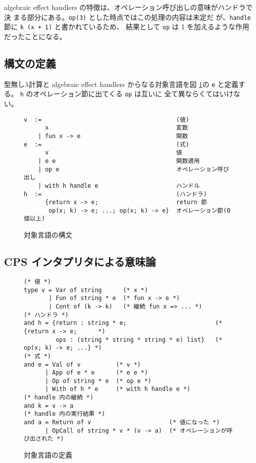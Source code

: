 algebraic effect handlers の特徴は、オペレーション呼び出しの意味がハンドラで決
まる部分にある。\texttt{op(3)} とした時点ではこの処理の内容は未定だ
が、\texttt{handle} 節に \texttt{k (x + 1)} と書かれているため、
結果として \texttt{op} は 1 を加えるような作用だったことになる。

\subsection{構文の定義}
\label{subsection:syntax}
型無し$\lambda$計算と algebraic effect handlers からなる対象言語を図 \ref{figure:abstract_syntax}の \texttt{e} と定義する。
\texttt{h} のオペレーション節に出てくる \texttt{op} は互いに
全て異ならくてはいけない。

\begin{figure}[t]
\begin{verbatim}
v  :=                                      (値)
      x                                    変数
    | fun x -> e                           関数
e  :=                                      (式)
      v                                    値
    | e e                                  関数適用
    | op e                                 オペレーション呼び出し
    | with h handle e                      ハンドル
h  :=                                      (ハンドラ)
      {return x -> e;                      return 節
       op(x; k) -> e; ...; op(x; k) -> e}  オペレーション節(0個以上)
\end{verbatim}
\caption{対象言語の構文}
\label{figure:abstract_syntax}
\end{figure}

\subsection{CPS インタプリタによる意味論}
\label{subsection:1cps}

\begin{figure}[t]
\begin{spacing}{0.9}
\begin{verbatim}
(* 値 *)
type v = Var of string      (* x *)
       | Fun of string * e  (* fun x -> e *)
       | Cont of (k -> k)   (* 継続 fun x => ... *)
(* ハンドラ *)
and h = {return : string * e;                         (* {return x -> e;      *)
         ops : (string * string * string * e) list}   (*  op(x; k) -> e; ...} *)
(* 式 *)
and e = Val of v          (* v *)
      | App of e * e      (* e e *)
      | Op of string * e  (* op e *)
      | With of h * e     (* with h handle e *)
(* handle 内の継続 *)
and k = v -> a
(* handle 内の実行結果 *)
and a = Return of v                      (* 値になった *)
      | OpCall of string * v * (v -> a)  (* オペレーションが呼び出された *)
\end{verbatim}
\caption{対象言語の定義}
\label{figure:syntax}
\end{spacing}
\end{figure}

